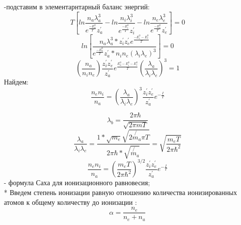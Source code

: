 \documentclass[letterpaper,12pt]{article} %
\begin{document}
-подставим в элементарнтарный баланс энергий:
\begin{equation} \label{eq:aperp} %
T[ln{\frac{n_a \lambda_{a}^{3}}{e^{\frac{-E_{a}^{0}}{T}}z_{a}^{'}}- ln{\frac{n_i \lambda_{i}^{3}}{e^{\frac{-E_{i}^{0}}{T}}z_{i}^{'}}}} - ln{\frac{n_e \lambda_{e}^{3}}{e^{\frac{-E_{e}^{0}}{T}}z_{e}^{'}}} ]=0 
\end{equation}
\begin{equation} \label{eq:aperp} %
ln[\frac{n_a \lambda_{a}^{3}* {z}_{i}^{'}{z}_{e}^{'}e^{\frac{-E_{i}^{0}-E_{e}^{0}}{T}}}{e^{\frac{-E_{a}^{0}}{T}}z_{a}^{'}* n_i n_e(\lambda_i \lambda_e)^3}]=0 
\end{equation}
\begin{equation} \label{eq:aperp} %
(\frac{n_a}{n_i n_e}) \frac{z_{i}^{'}z_{e}^{'}}{z_{a}^{'}}e^\frac{E_{a}^{0}-E_{i}^{0}-E_{e}^{0}}{T}(\frac{\lambda_a}{\lambda_i \lambda_e})^3=1 
\end{equation}
Найдем:
\begin{equation} \label{eq:aperp} %
\frac{n_e n_i}{n_a}=(\frac{\lambda_a}{\lambda_i \lambda_e})^3\frac{z_{i}^{'}z_{e}^{'}}{z_{a}^{'}}e^{-\frac{I}{T}} 
\end{equation}

\begin{equation} \label{eq:aperp} %
\lambda_b= \frac{2 \pi \hbar}{\sqrt{2 \pi m T}}
\end{equation}
\begin{equation} \label{eq:aperp} %
\frac{\lambda_a}{\lambda_i \lambda_e}=\frac{1* \sqrt{m_e} \sqrt{2 \not{m_a} \pi T}}{2 \pi \hbar * \sqrt{\not{m_a}}}= \sqrt{\frac{m_eT}{2 \pi \hbar^2}}
\end{equation}
\begin{equation} \label{eq:aperp} %
\frac{n_e n_i}{n_a} = (\frac{m_eT}{2 \pi \hbar^2})^{3/2}\frac{z_{i}^{'}z_{e}^{'}}{z_{a}^{'}}e^{-\frac{I}{T}}
\end{equation}
- формула Саха для ионизационного равновесия;
\\*
Введем степень ионизации равную отношению количества ионизированных атомов к общему количеству до ионизации :
\begin{equation} \label{eq:aperp} %
\alpha= \frac{n_e}{n_e+n_a}
\end{equation}
\end{document}
